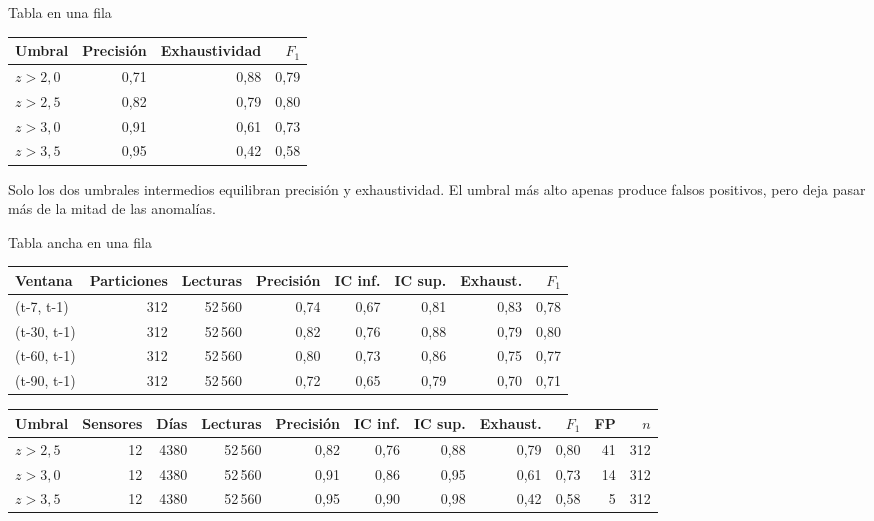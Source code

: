 \documentclass[aspectratio=169,9pt]{beamer}
\begin{document}
\begin{frame}{Tabla en una fila}
\begin{tworows}

  \begin{tabular}{@{}lrrr@{}}
    \toprule
    Umbral        & Precisión & Exhaustividad & $F_1$ \\
    \midrule
    $z > 2{,}0$   & 0,71  & 0,88  & 0,79 \\
    $z > 2{,}5$   & 0,82  & 0,79  & 0,80 \\
    $z > 3{,}0$   & 0,91  & 0,61  & 0,73 \\
    $z > 3{,}5$   & 0,95  & 0,42  & 0,58 \\
    \bottomrule
  \end{tabular}
\nextrow

  Solo los dos umbrales intermedios equilibran precisión y exhaustividad.
  El umbral más alto apenas produce falsos positivos, pero deja pasar más de
  la mitad de las anomalías.
\end{tworows}
\end{frame}

\begin{frame}{Tabla ancha en una fila}
\begin{tworows}

  \begin{tabular}{@{}lrrrrrrr@{}}
    \toprule
    Ventana & Particiones & Lecturas & Precisión & IC inf. & IC sup. & Exhaust. & $F_1$ \\
    \midrule
    (t-7, t-1)   & 312 & 52\,560 & 0,74 & 0,67 & 0,81 & 0,83 & 0,78 \\
    (t-30, t-1)  & 312 & 52\,560 & 0,82 & 0,76 & 0,88 & 0,79 & 0,80 \\
    (t-60, t-1)  & 312 & 52\,560 & 0,80 & 0,73 & 0,86 & 0,75 & 0,77 \\
    (t-90, t-1)  & 312 & 52\,560 & 0,72 & 0,65 & 0,79 & 0,70 & 0,71 \\
    \bottomrule
  \end{tabular}
\nextrow

  \begin{tabular}{@{}lrrrrrrrrrr@{}}
    \toprule
    Umbral & Sensores & Días & Lecturas & Precisión & IC inf. & IC sup. & Exhaust. & $F_1$ & FP & $n$ \\
    \midrule
    $z > 2{,}5$ & 12 & 4380 & 52\,560 & 0,82 & 0,76 & 0,88 & 0,79 & 0,80 & 41 & 312 \\
    $z > 3{,}0$ & 12 & 4380 & 52\,560 & 0,91 & 0,86 & 0,95 & 0,61 & 0,73 & 14 & 312 \\
    $z > 3{,}5$ & 12 & 4380 & 52\,560 & 0,95 & 0,90 & 0,98 & 0,42 & 0,58 &  5 & 312 \\
    \bottomrule
  \end{tabular}
\end{tworows}
\end{frame}
\end{document}
